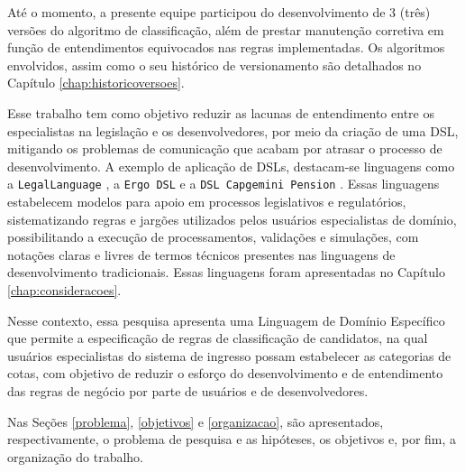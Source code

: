 Até o momento, a presente equipe participou do desenvolvimento de 3 (três) versões do algoritmo de classificação, além de prestar manutenção corretiva em função de entendimentos equivocados nas regras implementadas.  Os algoritmos envolvidos, assim como o seu histórico de versionamento são detalhados no Capítulo \ref{chap:historicoversoes}.

Esse trabalho tem como objetivo reduzir as lacunas de entendimento entre os especialistas na legislação e os desenvolvedores, por meio da criação de uma \gls{DSL}, mitigando os problemas de comunicação que acabam por atrasar o processo de desenvolvimento. A exemplo de aplicação de DSLs, destacam-se linguagens como a \texttt{LegalLanguage} \cite{legallanguage}, a \texttt{Ergo DSL} \cite{accordproject} e a \texttt{DSL Capgemini Pension} \cite{kolkhenk2008}. Essas linguagens estabelecem modelos para apoio em processos legislativos e regulatórios, sistematizando regras e jargões utilizados pelos usuários especialistas de domínio, possibilitando a execução de processamentos, validações e simulações, com notações claras e livres de termos técnicos presentes nas linguagens de desenvolvimento tradicionais. Essas linguagens foram apresentadas no Capítulo \ref{chap:consideracoes}.

Nesse contexto, essa pesquisa apresenta uma Linguagem de Domínio Específico que permite a especificação de regras de classificação de candidatos, na qual usuários especialistas do sistema de ingresso possam estabelecer as categorias de cotas, com objetivo de reduzir o esforço do desenvolvimento e de entendimento das regras de negócio por parte de usuários e de desenvolvedores. 

Nas Seções \ref{problema}, \ref{objetivos} e \ref{organizacao}, são apresentados, respectivamente, o problema de pesquisa e as hipóteses, os objetivos e, por fim, a organização do trabalho.
